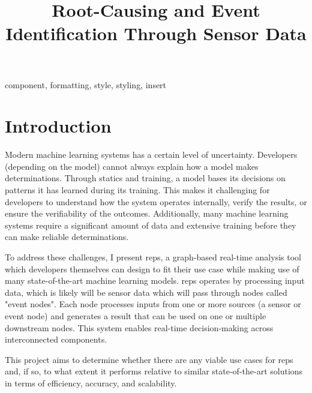 \documentclass[conference]{IEEEtran}
\begin{document}
	\title{Root-Causing and Event Identification Through Sensor Data}
	
	\author{
	}
	
	\maketitle
	
	\begin{abstract}
	\end{abstract}
	
	\begin{IEEEkeywords}
		component, formatting, style, styling, insert
	\end{IEEEkeywords}
	
	\section{Introduction}	
		Modern machine learning systems has a certain level of uncertainty. Developers (depending on the model) cannot always explain how a model makes determinations.  Through statics and training, a model bases its decisions on patterns it has learned during its training. This makes it challenging for developers to understand how the system operates internally, verify the results, or ensure the verifiability of the outcomes. Additionally, many machine learning systems require a significant amount of data and extensive training before they can make reliable determinations.
		
		To address these challenges, I present \gls{reps}, a graph-based real-time analysis tool which developers themselves can design to fit their use case while making use of many state-of-the-art machine learning models. \gls{reps} operates by processing input data, which is likely will be sensor data which will pass through nodes called "event nodes". Each node processes inputs from one or more sources (a sensor or event node) and generates a result that can be used on one or multiple downstream nodes. This system enables	real-time decision-making across interconnected components.
		
		This project aims to determine whether there are any viable use cases for \gls{reps} and, if so, to what extent it performs relative to similar state-of-the-art solutions in terms of efficiency, accuracy, and scalability.
		
\end{document}
